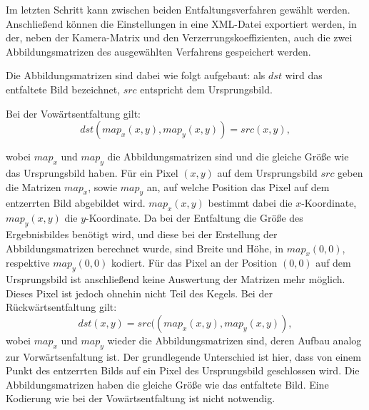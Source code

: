 Im letzten Schritt kann zwischen beiden Entfaltungsverfahren gewählt werden. Anschließend können die Einstellungen in eine XML-Datei exportiert werden, in der, neben der Kamera-Matrix und den Verzerrungskoeffizienten, auch die zwei Abbildungsmatrizen des ausgewählten Verfahrens gespeichert werden.


Die Abbildungsmatrizen sind dabei wie folgt aufgebaut: als $dst$ wird das entfaltete Bild bezeichnet, $src$ entspricht dem Ursprungsbild.

Bei der Vowärtsentfaltung gilt:
\[
dst(map_x(x,y), map_y(x,y)) = src(x,y),
\]

wobei $map_x$ und $map_y$ die Abbildungsmatrizen sind und die gleiche Größe wie das Ursprungsbild haben. Für ein Pixel $(x,y)$ auf dem Ursprungsbild $src$ geben die Matrizen $map_x$, sowie $map_y$ an, auf welche Position das Pixel auf dem entzerrten Bild abgebildet wird. $map_x(x,y)$ bestimmt dabei die $x$-Koordinate, $map_y(x,y)$ die $y$-Koordinate. Da bei der Entfaltung die Größe des Ergebnisbildes benötigt wird, und diese bei der Erstellung der Abbildungsmatrizen berechnet wurde, sind Breite und Höhe, in $map_x(0,0)$, respektive $map_y(0,0)$ kodiert. Für das Pixel an der Position $(0,0)$ auf dem Ursprungsbild ist anschließend keine Auswertung der Matrizen mehr möglich. Dieses Pixel ist jedoch ohnehin nicht Teil des Kegels.
\newpage
Bei der Rückwärtsentfaltung gilt:
\[
dst(x,y) = src((map_x(x,y),map_y(x,y)),
\]
wobei $map_x$ und $map_y$ wieder die Abbildungsmatrizen sind, deren Aufbau analog zur Vorwärtsenfaltung ist. 
Der grundlegende Unterschied ist hier, dass von einem Punkt des entzerrten Bilds auf ein Pixel des Ursprungsbild geschlossen wird. 
Die Abbildungsmatrizen haben die gleiche Größe wie das entfaltete Bild. Eine Kodierung wie bei der Vowärtsentfaltung ist nicht notwendig.
